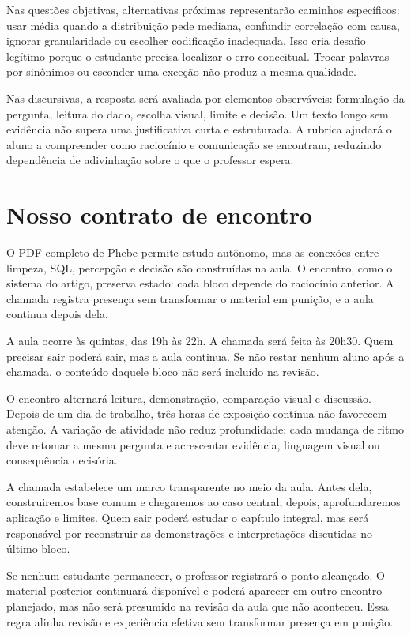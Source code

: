Nas questões objetivas, alternativas próximas representarão caminhos específicos: usar média quando a distribuição pede mediana, confundir correlação com causa, ignorar granularidade ou escolher codificação inadequada. Isso cria desafio legítimo porque o estudante precisa localizar o erro conceitual. Trocar palavras por sinônimos ou esconder uma exceção não produz a mesma qualidade.

Nas discursivas, a resposta será avaliada por elementos observáveis: formulação da pergunta, leitura do dado, escolha visual, limite e decisão. Um texto longo sem evidência não supera uma justificativa curta e estruturada. A rubrica ajudará o aluno a compreender como raciocínio e comunicação se encontram, reduzindo dependência de adivinhação sobre o que o professor espera.

\section{Nosso contrato de encontro}

O PDF completo de Phebe permite estudo autônomo, mas as conexões entre limpeza, SQL, percepção e decisão são construídas na aula. O encontro, como o sistema do artigo, preserva estado: cada bloco depende do raciocínio anterior. A chamada registra presença sem transformar o material em punição, e a aula continua depois dela.

A aula ocorre às quintas, das 19h às 22h. A chamada será feita às 20h30. Quem precisar sair poderá sair, mas a aula continua. Se não restar nenhum aluno após a chamada, o conteúdo daquele bloco não será incluído na revisão.

O encontro alternará leitura, demonstração, comparação visual e discussão. Depois de um dia de trabalho, três horas de exposição contínua não favorecem atenção. A variação de atividade não reduz profundidade: cada mudança de ritmo deve retomar a mesma pergunta e acrescentar evidência, linguagem visual ou consequência decisória.

A chamada estabelece um marco transparente no meio da aula. Antes dela, construiremos base comum e chegaremos ao caso central; depois, aprofundaremos aplicação e limites. Quem sair poderá estudar o capítulo integral, mas será responsável por reconstruir as demonstrações e interpretações discutidas no último bloco.

Se nenhum estudante permanecer, o professor registrará o ponto alcançado. O material posterior continuará disponível e poderá aparecer em outro encontro planejado, mas não será presumido na revisão da aula que não aconteceu. Essa regra alinha revisão e experiência efetiva sem transformar presença em punição.

